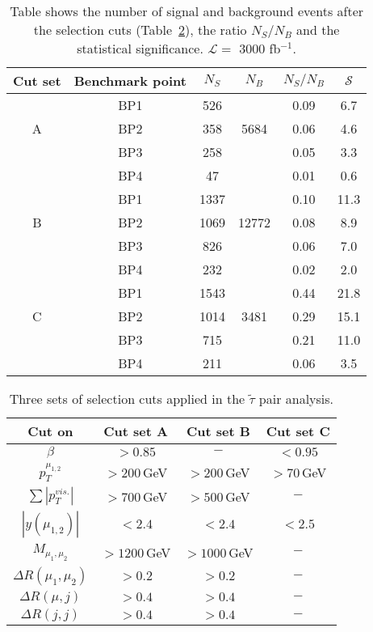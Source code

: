\documentclass[10pt]{article}
\newcommand{\stau}{\tilde{\tau}}
\begin{document}
\begin{table}[!ht]
	\centering
	\begin{tabular}{|c|c|c|c|c|c|}
		\hline 
		Cut set   & Benchmark point &  $N_S$ & $N_B$ & $N_S/N_B$ & $\mathcal{S}$ \\
		\hline 
		\multirow{3}{0.5cm}{A}  & BP1 & 526 &      & 0.09 & 6.7 \\ 
		& BP2 & 358 & 5684 & 0.06 & 4.6 \\
		& BP3 & 258 &      & 0.05 & 3.3 \\
		& BP4 & 47  &      & 0.01 & 0.6 \\
		\hline
		\multirow{3}{0.5cm}{B}  & BP1 & 1337 &       & 0.10 & 11.3 \\ 
		& BP2 & 1069 & 12772 & 0.08 & 8.9 \\
		& BP3 & 826  &       & 0.06 & 7.0 \\
		& BP4 & 232  &       & 0.02 & 2.0 \\
		\hline
		\multirow{3}{0.5cm}{C}  & BP1 & 1543 &      & 0.44 & 21.8 \\ 
		& BP2 & 1014 & 3481 & 0.29 & 15.1 \\
		& BP3 & 715  &      & 0.21 & 11.0 \\
		& BP4 & 211  &      & 0.06 & 3.5  \\ 
		\hline
	\end{tabular} 
	\caption{Table shows the number of signal and background events after the selection cuts (Table~\ref{tab:cuts}), the ratio $N_S/N_B$ and the statistical significance. $\mathcal{L} =$ 3000 fb$^{-1}$.}
	\label{tab:sig}
\end{table}

\begin{table}
	\centering
	\begin{tabular}{|c|c|c|c|}
		\hline
		Cut on  & Cut set A  & Cut set B & Cut set C  \\ 
		\hline \hline
		$\beta$ &  $> 0.85$ & $-$ & $ < 0.95$ \\
		$p_T^{\mu_{1,2}}$ & $> 200$\,GeV & $> 200$\,GeV & $> 70$\,GeV \\
		$\sum{|p_T^{vis.}|}$ & $ > 700$\,GeV & $ > 500$\,GeV & $-$ \\
		$|y(\mu_{1,2})|$ & $ < 2.4$ & $ < 2.4$ & $ < 2.5$ \\
		$M_{\mu_1, \mu_2}$ & $> 1200$\,GeV & $ > 1000$\,GeV & $-$ \\ 
		$\Delta R(\mu_1,\mu_2)$ & $> 0.2$ & $> 0.2$ & $-$ \\
		$\Delta R(\mu,j)$ & $> 0.4$ & $> 0.4$ & $-$ \\
		$\Delta R(j,j)$ & $> 0.4$ & $> 0.4$ & $-$ \\
		\hline 
	\end{tabular}
	\caption{Three sets of selection cuts applied in the $\stau$ pair analysis.}
	\label{tab:cuts}
\end{table}
\end{document}
